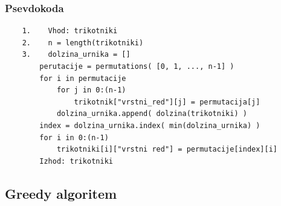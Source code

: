 \documentclass[a4paper,12pt]{article}
\theoremstyle{definition}
\theoremstyle{plain}
\begin{document}
\subsubsection{Psevdokoda}
\begin{verbatim}
    1.    Vhod: trikotniki
    2.    n = length(trikotniki)
    3.    dolzina_urnika = []
        perutacije = permutations( [0, 1, ..., n-1] )
        for i in permutacije
            for j in 0:(n-1)
                trikotnik["vrstni_red"][j] = permutacija[j]
            dolzina_urnika.append( dolzina(trikotniki) )
        index = dolzina_urnika.index( min(dolzina_urnika) )
        for i in 0:(n-1)
            trikotniki[i]["vrstni red"] = permutacije[index][i]
        Izhod: trikotniki

\end{verbatim}




\subsection{Greedy algoritem}
\end{document}
